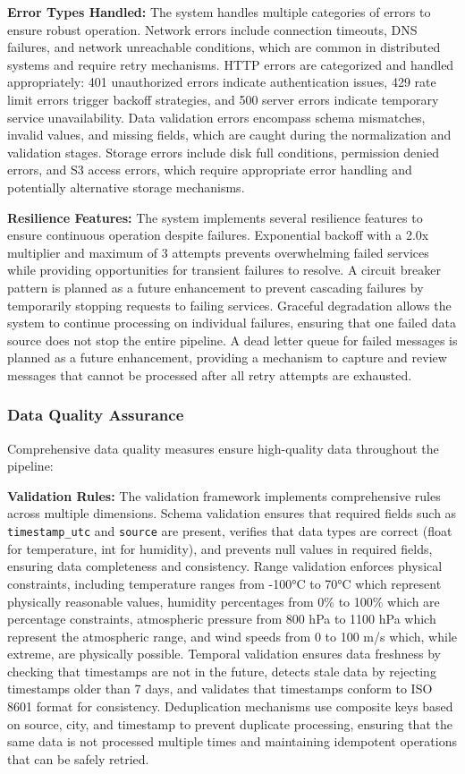 \documentclass[12pt,a4paper]{article}
\begin{document}
\textbf{Error Types Handled:} The system handles multiple categories of errors to ensure robust operation. Network errors include connection timeouts, DNS failures, and network unreachable conditions, which are common in distributed systems and require retry mechanisms. HTTP errors are categorized and handled appropriately: 401 unauthorized errors indicate authentication issues, 429 rate limit errors trigger backoff strategies, and 500 server errors indicate temporary service unavailability. Data validation errors encompass schema mismatches, invalid values, and missing fields, which are caught during the normalization and validation stages. Storage errors include disk full conditions, permission denied errors, and S3 access errors, which require appropriate error handling and potentially alternative storage mechanisms.

\textbf{Resilience Features:} The system implements several resilience features to ensure continuous operation despite failures. Exponential backoff with a 2.0x multiplier and maximum of 3 attempts prevents overwhelming failed services while providing opportunities for transient failures to resolve. A circuit breaker pattern is planned as a future enhancement to prevent cascading failures by temporarily stopping requests to failing services. Graceful degradation allows the system to continue processing on individual failures, ensuring that one failed data source does not stop the entire pipeline. A dead letter queue for failed messages is planned as a future enhancement, providing a mechanism to capture and review messages that cannot be processed after all retry attempts are exhausted.

\subsubsection{Data Quality Assurance}

Comprehensive data quality measures ensure high-quality data throughout the pipeline:

\textbf{Validation Rules:} The validation framework implements comprehensive rules across multiple dimensions. Schema validation ensures that required fields such as \texttt{timestamp\_utc} and \texttt{source} are present, verifies that data types are correct (float for temperature, int for humidity), and prevents null values in required fields, ensuring data completeness and consistency. Range validation enforces physical constraints, including temperature ranges from -100°C to 70°C which represent physically reasonable values, humidity percentages from 0\% to 100\% which are percentage constraints, atmospheric pressure from 800 hPa to 1100 hPa which represent the atmospheric range, and wind speeds from 0 to 100 m/s which, while extreme, are physically possible. Temporal validation ensures data freshness by checking that timestamps are not in the future, detects stale data by rejecting timestamps older than 7 days, and validates that timestamps conform to ISO 8601 format for consistency. Deduplication mechanisms use composite keys based on source, city, and timestamp to prevent duplicate processing, ensuring that the same data is not processed multiple times and maintaining idempotent operations that can be safely retried.
\end{document}
